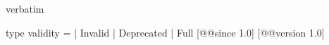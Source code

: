 \begin{camlexample}{verbatim}
\begin{caml}
\begin{camlinput}
type validity = | Invalid | Deprecated | Full [@@since 1.0] [@@version 1.0]
\end{camlinput}
\end{caml}
\end{camlexample}

